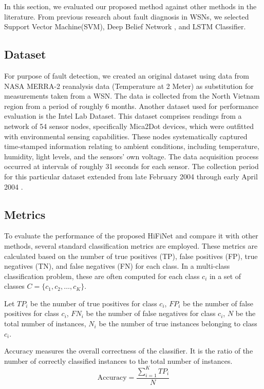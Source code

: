 In this section, we evaluated our proposed method against other methods in the literature. From previous research about fault diagnosis in WSNs, we selected Support Vector Machine(SVM), Deep Belief Network \cite{Prasad2023}, and LSTM Classifier.

\subsection{Dataset}
For purpose of fault detection, we created an original dataset using data from NASA MERRA-2 reanalysis data (Temperature at 2 Meter) as substitution for measurements taken from a WSN. The data is collected from the North Vietnam region from a period of roughly 6 months. Another dataset used for performance evaluation is the Intel Lab Dataset. This dataset comprises readings from a network of 54 sensor nodes, specifically Mica2Dot devices, which were outfitted with environmental sensing capabilities. These nodes systematically captured time-stamped information relating to ambient conditions, including temperature, humidity, light levels, and the sensors' own voltage. The data acquisition process occurred at intervals of roughly 31 seconds for each sensor. The collection period for this particular dataset extended from late February 2004 through early April 2004 \cite{Intel2004}.

\subsection{Metrics}
To evaluate the performance of the proposed HiFiNet and compare it with other methods, several standard classification metrics are employed. These metrics are calculated based on the number of true positives (TP), false positives (FP), true negatives (TN), and false negatives (FN) for each class. In a multi-class classification problem, these are often computed for each class $c_i$ in a set of classes $C = \{c_1, c_2, \dots, c_K\}$.

Let \(TP_i\) be the number of true positives for class \(c_i\), \(FP_i\) be the number of false positives for class \(c_i\), \(FN_i\) be the number of false negatives for class \(c_i\), \(N\) be the total number of instances, \(N_i\) be the number of true instances belonging to class \(c_i\).

Accuracy measures the overall correctness of the classifier. It is the ratio of the number of correctly classified instances to the total number of instances.
\[\text{Accuracy} = \frac{\sum_{i=1}^{K} TP_i}{N}\]

